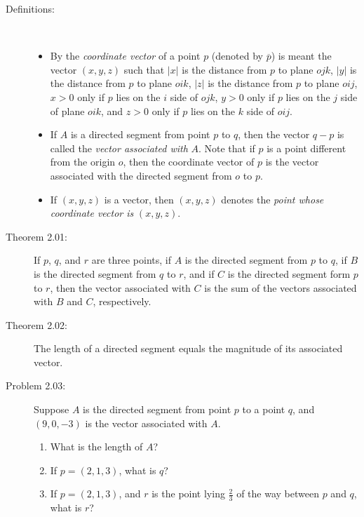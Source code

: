 \documentclass{article}
\begin{document}
\begin{description}

  \item[Definitions:] $\ $
    \begin{itemize}
      \item By the \emph{coordinate vector} of a point $p$ (denoted by $\overline{p}$) is meant the vector $(x,y,z)$ such that $\vert x \vert$ is the distance from $p$ to plane $ojk$, $\vert y \vert$ is the distance from $p$ to plane $oik$, $\vert z \vert$ is the distance from $p$ to plane $oij$, $x>0$ only if $p$ lies on the $i$ side of $ojk$, $y>0$ only if $p$ lies on the $j$ side of plane $oik$, and $z>0$ only if $p$ lies on the $k$ side of $oij$. 
      \item If $A$ is a directed segment from point $p$ to $q$, then the vector $q-p$ is called the \emph{vector associated with} $A$. Note that if $p$ is a point different from the origin $o$, then the coordinate vector of $p$ is the vector associated with the directed segment from $o$ to $p$. 
      \item If $(x,y,z)$ is a vector, then $(x,y,z)$ denotes the \emph{point whose coordinate vector is} $(x,y,z)$.
    \end{itemize}

  \item[Theorem 2.01:] If $p$, $q$, and $r$ are three points, if $A$ is the directed segment from $p$ to $q$, if $B$ is the directed segment from $q$ to $r$, and if $C$ is the directed segment form $p$ to $r$, then the vector associated with $C$ is the sum of the vectors associated with $B$ and $C$, respectively.

  \item[Theorem 2.02:] The length of a directed segment equals the magnitude of its associated vector.

  \item[Problem 2.03:] Suppose $A$ is the directed segment from point $p$ to a point $q$, and $(9,0,-3)$ is the vector associated with $A$.
    \begin{enumerate}[\hspace{1cm}(a)]
      \item What is the length of $A$?
      \item If $p=(2,1,3)$, what is $q$?
      \item If $p=(2,1,3)$, and $r$ is the point lying $\frac{2}{3}$ of the way between $p$ and $q$, what is $r$?
    \end{enumerate}


\end{description}
\end{document}
